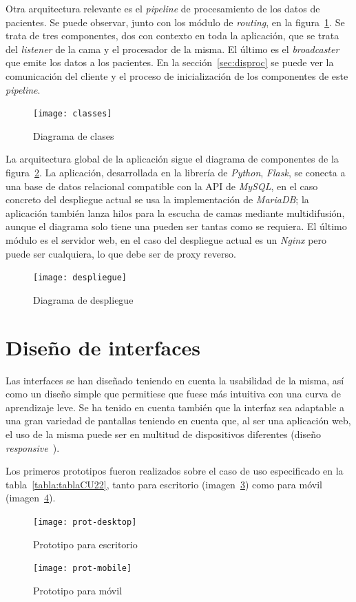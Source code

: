 Otra arquitectura relevante es el \textit{pipeline} de procesamiento de los datos de pacientes. Se puede observar, junto con los módulo de \textit{routing}, en la figura~\ref{fig:classes}. Se trata de tres componentes, dos con contexto en toda la aplicación, que se trata del \textit{listener} de la cama y el procesador de la misma. El último es el \textit{broadcaster} que emite los datos a los pacientes. En la sección~\ref{sec:disproc} se puede ver la comunicación del cliente y el proceso de inicialización de los componentes de este \textit{pipeline}.

\begin{figure}
	\centering
	\texttt{[image: classes]}
	\caption{Diagrama de clases}
	\label{fig:classes}
\end{figure}

La arquitectura global de la aplicación sigue el diagrama de componentes de la figura~\ref{fig:despl}. La aplicación, desarrollada en la librería de \textit{Python}, \textit{Flask}, se conecta a una base de datos relacional compatible con la API de \textit{MySQL}, en el caso concreto del despliegue actual se usa la implementación de \textit{MariaDB}; la aplicación también lanza hilos para la escucha de camas mediante multidifusión, aunque el diagrama solo tiene una pueden ser tantas como se requiera. El último módulo es el servidor web, en el caso del despliegue actual es un \textit{Nginx} pero puede ser cualquiera, lo que debe ser de proxy reverso.

\begin{figure}
	\centering
	\texttt{[image: despliegue]}
	\caption{Diagrama de despliegue}
	\label{fig:despl}
\end{figure}



\section{Diseño de interfaces}

Las interfaces se han diseñado teniendo en cuenta la usabilidad de la misma, así como un diseño simple que permitiese que fuese más intuitiva con una curva de aprendizaje leve. Se ha tenido en cuenta también que la interfaz sea adaptable a una gran variedad de pantallas teniendo en cuenta que, al ser una aplicación web, el uso de la misma puede ser en multitud de dispositivos diferentes (diseño \textit{responsive}~\cite{wiki:responsive}).

Los primeros prototipos fueron realizados sobre el caso de uso especificado en la tabla~\ref{tabla:tablaCU22}, tanto para escritorio (imagen~\ref{fig:proto-desk}) como para móvil (imagen~\ref{fig:proto-mob}).

\begin{figure}[h]
	\centering
	\texttt{[image: prot-desktop]}
	\caption{Prototipo para escritorio}
	\label{fig:proto-desk}
\end{figure}

\begin{figure}[h]
	\centering
	\texttt{[image: prot-mobile]}
	\caption{Prototipo para móvil}
	\label{fig:proto-mob}
\end{figure}
